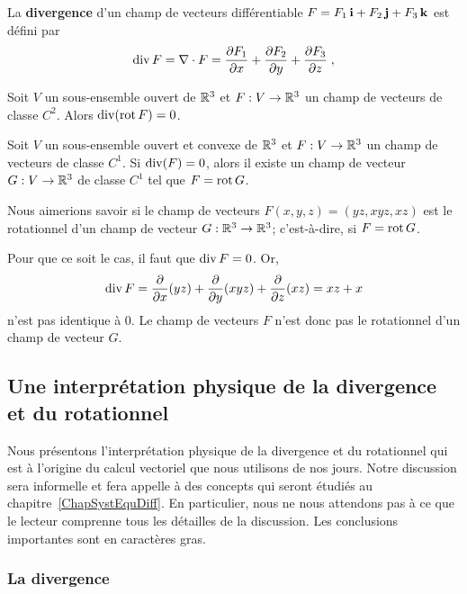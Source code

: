 {\begin{focus}{\dfn} 
La {\bfseries divergence} d'un champ de vecteurs différentiable
$F = F_1\,\ii + F_2\,\jj + F_3\,\kk$ est défini par
\[
\diV F =  \nabla \cdot F
= \pdydx{F_1}{x} + \pdydx{F_2}{y} + \pdydx{F_3}{z} \; ,
\]
\end{focus}

\begin{focus}{\prp}
Soit $V$ un sous-ensemble ouvert de $\RR^3$ et $F:V\to \RR^3$ un
champ de vecteurs de classe $C^2$.  Alors $\diV(\curl F) = 0$.
\end{focus}

\begin{focus}{\prp}
Soit $V$ un sous-ensemble ouvert et convexe de $\RR^3$ et
$F:V\to \RR^3$ un champ de vecteurs de classe $C^1$.  Si
$\diV(F) = 0$, alors il existe un champ de vecteur $G:V \to \RR^3$ de
classe $C^1$ tel que $F = \curl G$.
\end{focus}

\begin{egg}
Nous aimerions savoir si le champ de vecteurs
$F(x,y,z) = (yz, x y z, xz)$ est le rotationnel d'un champ de vecteur
$G:\RR^3 \to \RR^3$; c'est-à-dire, si $F = \curl G$.

Pour que ce soit le cas, il faut que $\diV F = 0$.  Or,
\[
  \diV F = \pdfdx{(yz)}{x} + \pdfdx{(xyz)}{y}
  + \pdfdx{(xz)}{z} = xz + x
\]
n'est pas identique à $0$.  Le champ de vecteurs $F$ n'est
donc pas le rotationnel d'un champ de vecteur $G$.
\end{egg}

\subsection{Une interprétation physique de la divergence et du
  rotationnel}

Nous présentons l'interprétation physique de la divergence et du
rotationnel qui est à l'origine du calcul vectoriel que nous utilisons de
nos jours.  Notre discussion sera informelle et fera appelle à des
concepts qui seront étudiés au chapitre~\ref{ChapSystEquDiff}.
En particulier, nous ne nous attendons pas à ce que le lecteur
comprenne tous les détailles de la discussion.  Les conclusions
importantes sont en caractères gras.

\subsubsection{La divergence}

}
